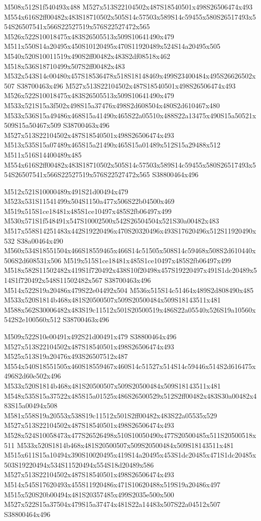 \documentclass{article}
\begin{document}
\begin{multicols}{2}
M508x512S1f540493x488 M527x513S22104502x487S18540501x498S26506474x493 M554x616S2ff00482x483S18710502x505S14c57503x589S14c59455x580S26517493x554S26507541x566S22527519x576S22527472x565 M526x522S10018475x483S26505513x509S10641490x479 M511x550S14a20495x450S10120495x470S11920489x524S14a20495x505 M540x520S10011519x490S2ff00482x483S2df08518x462 M518x536S18710499x507S2ff00482x483 M532x543S14c00480x457S18536478x518S18148469x499S23400484x495S26626502x507 S38700463x496 M527x513S22104502x487S18540501x498S26506474x493 M526x522S10018475x483S26505513x509S10641490x479 M533x521S15a3f502x498S15a37476x498S2d608504x480S2d610467x480 M533x536S15a49486x468S15a41490x465S22a05510x488S22a13475x490S15a50521x509S15a50467x509 S38700463x496 M527x513S22104502x487S18540501x498S26506474x493 M513x535S15a07489x465S15a21490x465S15a01489x512S15a29488x512 M511x516S14400489x485 M554x616S2ff00482x483S18710502x505S14c57503x589S14c59455x580S26517493x554S26507541x566S22527519x576S22527472x565 S38800464x496

M512x521S10000489x491S21d00494x479 M523x531S11541499x504S1150a477x506S22b04500x469 M519x515S1ce18481x485S1ce10497x485S2fb06497x499 M530x571S1f548491x547S10002500x542S26504504x521S30a00482x483 M517x558S14251483x442S19220496x470S20320496x493S17620496x512S11920490x532 S38a00464x490 M560x534S18551504x466S18559465x466S14c51505x508S14c59468x508S2d610440x506S2d608531x506 M519x515S1ce18481x485S1ce10497x485S2fb06497x499 M518x582S11502482x419S1f720492x438S10f20498x457S19220497x491S1dc20489x514S1f720492x548S11502482x567 S38700463x496 M514x522S19a20486x479S22e04492x504 M536x515S14c51464x489S2d808490x485 M533x520S1814b468x481S20500507x509S20500484x509S18143511x481 M588x562S30006482x483S19c11512x501S20500519x486S22a05540x526S19a10560x542S2e100560x512 S38700463x496

M509x522S10e00491x492S21d00491x479 S38800464x496 M527x513S22104502x487S18540501x498S26506474x493 M525x513S19a20476x493S26507512x487 M554x540S18551505x460S18559467x460S14c51527x514S14c59446x514S2d616475x496S2d60e502x496 M533x520S1814b468x481S20500507x509S20500484x509S18143511x481 M548x535S15a37522x485S15a01525x486S26500529x512S2ff00482x483S30a00482x483S15a00494x508 M581x558S19a20553x538S19c11512x501S2ff00482x483S22a05535x529 M527x513S22104502x487S18540501x498S26506474x493 M528x524S10058473x477S26526498x510S10050490x477S20500485x511S20500518x511 M533x520S1814b468x481S20500507x509S20500484x509S18143511x481 M515x611S15a10494x390S10020495x419S14a20495x453S1dc20485x471S1dc20485x503S19220494x534S11520494x554S18d20489x586 M527x513S22104502x487S18540501x498S26506474x493 M514x545S17620493x455S11920486x471S10620488x519S19a20486x497 M515x520S20b00494x481S20357485x499S2035e500x500 M527x522S15a37504x479S15a37474x481S22a14483x507S22a04512x507 S38800464x496


\end{multicols}
\end{document}
